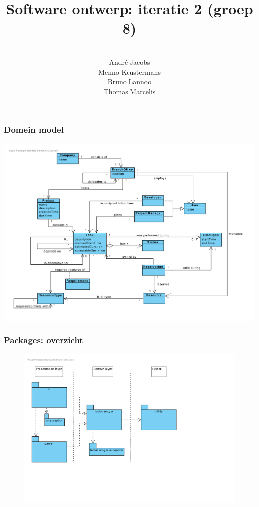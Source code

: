 \documentclass{beamer}
\title[Software ontwerp: iteratie 2]{Software ontwerp: iteratie 2 (groep 8)} %
\author[Groep 8]{\\
        Andr\'e Jacobs \\
        Menno Keustermans\\
        Bruno Lannoo \\
        Thomas Marcelis} %
\institute[KULeuven] %
{\\ %
\medskip
\textit{} %
}
\date{} %
\begin{document}
\begin{frame}
\titlepage %
\end{frame}



%       
\begin{frame}
\frametitle{Domein model}
\includegraphics[scale=0.4]{figures/DomainModel}
\end{frame}
\begin{frame}
\frametitle {Packages: overzicht}
\begin{figure}
\begin{center}
\includegraphics[scale=0.45]{figures/Package_diagram}
\end{center}
\end{figure}
\end{frame}
\end{document}
